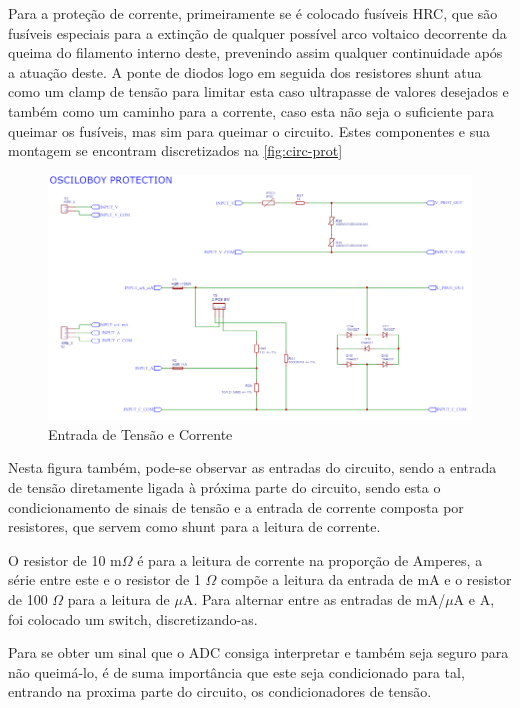Para a proteção de corrente, primeiramente se é colocado fusíveis \gls{HRC}, que são fusíveis especiais para a extinção de qualquer possível arco voltaico decorrente da queima do filamento interno deste, prevenindo assim qualquer continuidade após a atuação deste. A ponte de diodos logo em seguida dos resistores shunt atua como um clamp de tensão para limitar esta caso ultrapasse de valores desejados e também como um caminho para a corrente, caso esta não seja o suficiente para queimar os fusíveis, mas sim para queimar o circuito. Estes componentes e sua montagem se encontram discretizados na \autoref{fig:circ-prot}

\begin{figure}[htb!]
    \caption{Entrada de Tensão e Corrente}
    \label{fig:circ-prot}
    \includegraphics[width=1.0\textwidth]{figuras/circ-prot.png}
    \fonte{}
\end{figure}

Nesta figura também, pode-se observar as entradas do circuito, sendo a entrada de tensão diretamente ligada à próxima parte do circuito, sendo esta o condicionamento de sinais de tensão e a entrada de corrente composta por resistores, que servem como shunt para a leitura de corrente.

O resistor de 10 m$\Omega$ é para a leitura de corrente na proporção de Amperes, a série entre este e o resistor de 1 $\Omega$ compõe a leitura da entrada de mA e o resistor de 100 $\Omega$ para a leitura de $\mu$A. Para alternar entre as entradas de mA/$\mu$A e A, foi colocado um switch, discretizando-as.

Para se obter um sinal que o ADC consiga interpretar e também seja seguro para não queimá-lo, é de suma importância que este seja condicionado para tal, entrando na proxima parte do circuito, os condicionadores de tensão.

